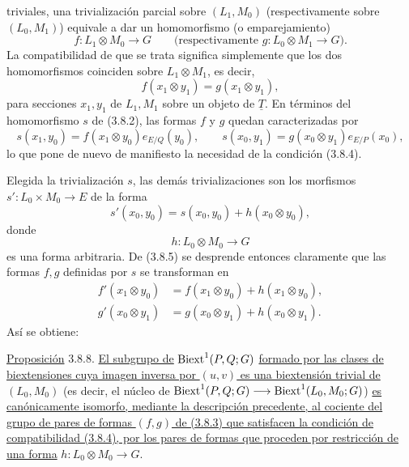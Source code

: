 triviales, una trivialización parcial sobre $(L_1,M_0)$
(respectivamente sobre $(L_0,M_1)$) equivale a dar un homomorfismo (o
emparejamiento)
\begin{equation}\tag{3.8.3}
 f:L_1\otimes M_0\longrightarrow G
 \qquad
 \bigl(\text{respectivamente }g:L_0\otimes M_1\longrightarrow G\bigr).
\end{equation}
La compatibilidad de que se trata significa simplemente que los dos
homomorfismos coinciden sobre $L_1\otimes M_1$, es decir,
\begin{equation}\tag{3.8.4}
 f(x_1\otimes y_1)=g(x_1\otimes y_1),
\end{equation}
para secciones $x_1,y_1$ de $L_1,M_1$ sobre un objeto de
$\underline T$. En términos del homomorfismo $s$ de (3.8.2), las
formas $f$ y $g$ quedan caracterizadas por
\begin{equation}\tag{3.8.5}
 s(x_1,y_0)=f(x_1\otimes y_0)e_{E/Q}(y_0),\qquad
 s(x_0,y_1)=g(x_0\otimes y_1)e_{E/P}(x_0),
\end{equation}
lo que pone de nuevo de manifiesto la necesidad de la condición
(3.8.4).

Elegida la trivialización $s$, las demás trivializaciones son los
morfismos $s':L_0\times M_0\longrightarrow E$ de la forma
\begin{equation}\tag{3.8.6}
 s'(x_0,y_0)=s(x_0,y_0)+h(x_0\otimes y_0),
\end{equation}
donde
\[
 h:L_0\otimes M_0\longrightarrow G
\]
es una forma arbitraria. De (3.8.5) se desprende entonces claramente
que las formas $f,g$ definidas por $s$ se transforman en
\begin{equation}\tag{3.8.7}
\begin{aligned}
 f'(x_1\otimes y_0)&=f(x_1\otimes y_0)+h(x_1\otimes y_0),\\
 g'(x_0\otimes y_1)&=g(x_0\otimes y_1)+h(x_0\otimes y_1).
\end{aligned}
\end{equation}
Así se obtiene:

\underline{Proposición} 3.8.8.
\underline{El subgrupo de} $\operatorname{Biext}^1(P,Q;G)$ \underline{formado por las clases
de biextensiones cuya imagen inversa por $(u,v)$ es una biextensión
trivial de $(L_0,M_0)$} (es decir, el núcleo de
$\operatorname{Biext}^1(P,Q;G)\longrightarrow\operatorname{Biext}^1(L_0,M_0;G)$)
\underline{es canónicamente isomorfo, mediante la descripción
precedente, al cociente del grupo de pares de formas $(f,g)$ de
(3.8.3) que satisfacen la condición de compatibilidad (3.8.4), por
los pares de formas que proceden por restricción de una forma}
$h:L_0\otimes M_0\longrightarrow G$.


